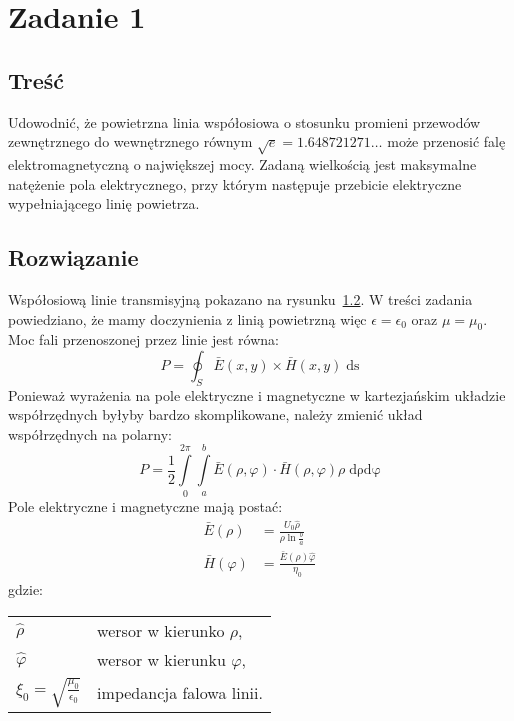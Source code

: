 \documentclass[rep.tex]{subfiles}
\begin{document}
\chapter{Zadanie 1}
\section{Treść}
Udowodnić, że powietrzna linia współosiowa o stosunku promieni
przewodów zewnętrznego do wewnętrznego równym
$\sqrt{e} = 1.648721271\ldots$ może przenosić falę
elektromagnetyczną o największej mocy.
Zadaną wielkością jest maksymalne natężenie pola elektrycznego,
przy którym następuje przebicie elektryczne wypełniającego
linię powietrza.

\section{Rozwiązanie}
\label{zad1:fig:coax}
Współosiową linie transmisyjną pokazano na rysunku~\ref{zad1:fig:coax}.
W treści zadania powiedziano, że mamy doczynienia z linią powietrzną więc $\epsilon = \epsilon_0$ oraz $\mu = \mu_0$.
Moc fali przenoszonej przez linie jest równa:
\begin{equation}
  P = \oint_S\bar{E}(x, y) \times \bar{H}(x, y) \; \mathrm{ds}
\end{equation}
Ponieważ wyrażenia na pole elektryczne i magnetyczne w kartezjańskim układzie współrzędnych byłyby bardzo skomplikowane,
należy zmienić układ współrzędnych na polarny:
\begin{equation}
  P = \frac{1}{2} \int\limits_0^{2\pi}\int\limits_a^b \bar{E}(\rho, \varphi) \cdot \bar{H}(\rho, \varphi) \rho \; \mathrm{d\rho} \mathrm{d\varphi}
\end{equation}
Pole elektryczne i magnetyczne mają postać:
\begin{align}
  \bar{E}(\rho)    & = \frac{U_0\hat{\rho}}{\rho \ln \frac{b}{a}} \\
  \bar{H}(\varphi) & = \frac{\bar{E}(\rho)\hat{\varphi}}{\eta_0}
\end{align}
gdzie: \\
\begin{tabular}{l @{ - } l}
  $\hat{\rho}$    & wersor w kierunko $\rho$, \\
  $\hat{\varphi}$ & wersor w kierunku $\varphi$, \\
  $\xi_0 = \sqrt{\frac{\mu_0}{\epsilon_0}}$ & impedancja falowa linii. \\
\end{tabular}
\end{document}
